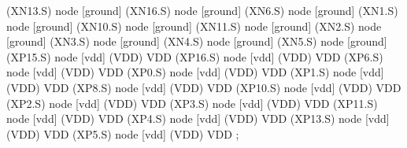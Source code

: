 \begin{circuitikz}[american]

	(XN13.S) node [ground] {}
	(XN16.S) node [ground] {}
	(XN6.S) node [ground] {}
	(XN1.S) node [ground] {}
	(XN10.S) node [ground] {}
	(XN11.S) node [ground] {}
	(XN2.S) node [ground] {}
	(XN3.S) node [ground] {}
	(XN4.S) node [ground] {}
	(XN5.S) node [ground] {}
	(XP15.S) node [vdd] (VDD) {VDD}
	(XP16.S) node [vdd] (VDD) {VDD}
	(XP6.S) node [vdd] (VDD) {VDD}
	(XP0.S) node [vdd] (VDD) {VDD}
	(XP1.S) node [vdd] (VDD) {VDD}
	(XP8.S) node [vdd] (VDD) {VDD}
	(XP10.S) node [vdd] (VDD) {VDD}
	(XP2.S) node [vdd] (VDD) {VDD}
	(XP3.S) node [vdd] (VDD) {VDD}
	(XP11.S) node [vdd] (VDD) {VDD}
	(XP4.S) node [vdd] (VDD) {VDD}
	(XP13.S) node [vdd] (VDD) {VDD}
	(XP5.S) node [vdd] (VDD) {VDD}
;

\end{circuitikz}
